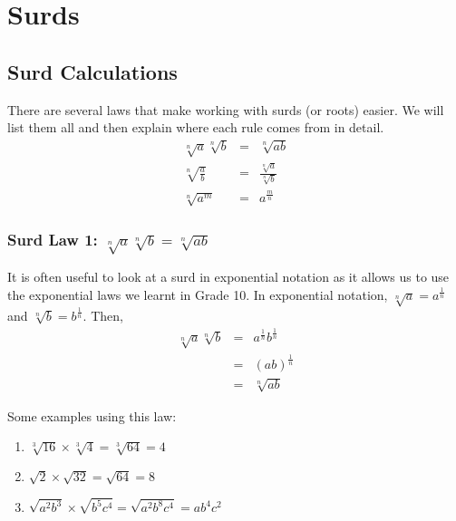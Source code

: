 \chapter{Surds}
\label{m:ng11}

\section{Surd Calculations}

There are several laws that make working with surds (or roots) easier. We will list them all and then explain where each rule comes from in detail.
\begin{eqnarray}
\label{eq:mn:s:1}
\sqrt[n]{a}\sqrt[n]{b}&=&\sqrt[n]{ab}\\
\label{eq:mn:s:2}
\sqrt[n]{\frac ab}&=&\frac{\sqrt[n]{a}}{\sqrt[n]{b}}\\
\label{eq:mn:s:3}
\sqrt[n]{a^m}&=&a^{\frac mn}
\end{eqnarray}

\subsection{Surd Law 1: $\sqrt[n]{a}\sqrt[n]{b}=\sqrt[n]{ab}$}
It is often useful to look at a surd in exponential notation as it allows us to use the exponential laws we learnt in Grade 10. In exponential notation, $\sqrt[n]{a}=a^{\frac{1}{n}}$ and $\sqrt[n]{b}=b^{\frac{1}{n}}$. Then,
\begin{eqnarray}
\label{eq:mn:s:1:exp}
\sqrt[n]{a}\sqrt[n]{b}&=&a^{\frac 1n}b^{\frac 1n}\\ \nonumber
&=&(ab)^{\frac 1n}\\ \nonumber
&=&\sqrt[n]{ab}
\end{eqnarray}

Some examples using this law:
\begin{enumerate}
\item{$\sqrt[3]{16}\times \sqrt[3]{4} = \sqrt[3]{64}=4$}
\item{$\sqrt{2}\times \sqrt{32}=\sqrt{64}=8$}
\item{$\sqrt{a^2b^3}\times \sqrt{b^5c^4}=\sqrt{a^2b^8c^4}= ab^4c^2$}
\end{enumerate}

